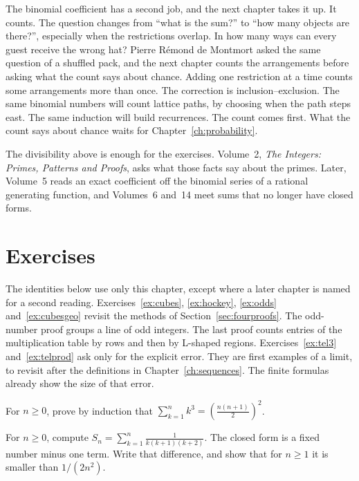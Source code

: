The binomial coefficient has a second job, and the next chapter takes it up. It counts. The question changes from ``what is the sum?'' to ``how many objects are there?'', especially when the restrictions overlap. In how many ways can every guest receive the wrong hat? Pierre R\'emond de Montmort asked the same question of a shuffled pack, and the next chapter counts the arrangements before asking what the count says about chance. Adding one restriction at a time counts some arrangements more than once. The correction is inclusion--exclusion. The same binomial numbers will count lattice paths, by choosing when the path steps east. The same induction will build recurrences. The count comes first. What the count says about chance waits for Chapter~\ref{ch:probability}.

The divisibility above is enough for the exercises. Volume~2, \emph{The Integers: Primes, Patterns and Proofs}, asks what those facts say about the primes. Later, Volume~5 reads an exact coefficient off the binomial series of a rational generating function, and Volumes~6 and~14 meet sums that no longer have closed forms.

\section{Exercises}
The identities below use only this chapter, except where a later chapter is named for a second reading. Exercises~\ref{ex:cubes}, \ref{ex:hockey}, \ref{ex:odds} and~\ref{ex:cubesgeo} revisit the methods of Section~\ref{sec:fourproofs}. The odd-number proof groups a line of odd integers. The last proof counts entries of the multiplication table by rows and then by L-shaped regions. Exercises~\ref{ex:tel3} and~\ref{ex:telprod} ask only for the explicit error. They are first examples of a limit, to revisit after the definitions in Chapter~\ref{ch:sequences}. The finite formulas already show the size of that error.

\begin{exercise}[$\star$]\label{ex:cubes}
For $n\ge0$, prove by induction that $\displaystyle\sum_{k=1}^n k^3=\left(\frac{n(n+1)}{2}\right)^2$.
\end{exercise}

\begin{exercise}[$\star$]\label{ex:tel3}
For $n\ge0$, compute $\displaystyle S_n=\sum_{k=1}^n\frac{1}{k(k+1)(k+2)}$. The closed form is a fixed number minus one term. Write that difference, and show that for $n\ge1$ it is smaller than $1/(2n^2)$.
\end{exercise}

